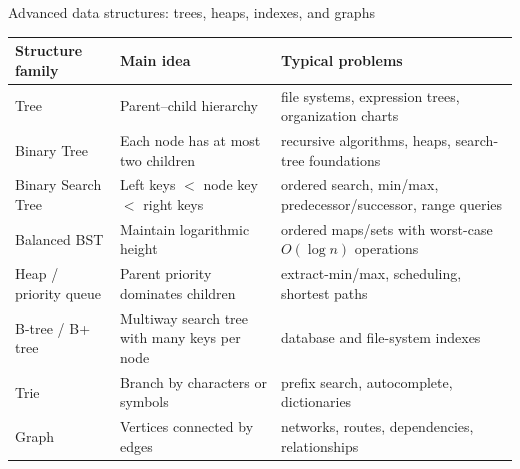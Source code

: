 \documentclass[aspectratio=169]{beamer}
\begin{document}
\begin{frame}{Advanced data structures: trees, heaps, indexes, and graphs}
\scriptsize
\begin{center}
\renewcommand{\arraystretch}{1.15}
\begin{tabular}{L{0.21\textwidth}L{0.34\textwidth}L{0.31\textwidth}}
\toprule
\textbf{Structure family} & \textbf{Main idea} & \textbf{Typical problems} \\
\midrule
Tree & Parent--child hierarchy & file systems, expression trees, organization charts \\
Binary Tree & Each node has at most two children & recursive algorithms, heaps, search-tree foundations \\
Binary Search Tree & Left keys $<$ node key $<$ right keys & ordered search, min/max, predecessor/successor, range queries \\
Balanced BST & Maintain logarithmic height & ordered maps/sets with worst-case $O(\log n)$ operations \\
Heap / priority queue & Parent priority dominates children & extract-min/max, scheduling, shortest paths \\
B-tree / B+ tree & Multiway search tree with many keys per node & database and file-system indexes \\
Trie & Branch by characters or symbols & prefix search, autocomplete, dictionaries \\
Graph & Vertices connected by edges & networks, routes, dependencies, relationships \\
\bottomrule
\end{tabular}
\end{center}
\end{frame}
\end{document}
